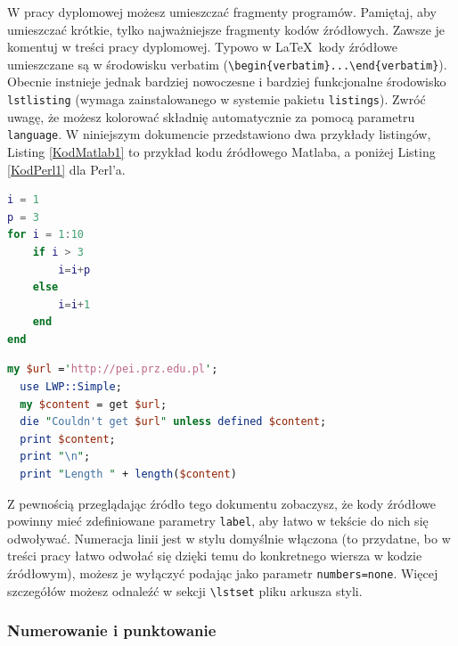 \documentclass[12pt,twoside]{article}
\begin{document}
W pracy dyplomowej możesz umieszczać fragmenty programów. Pamiętaj, aby umieszczać krótkie, tylko najważniejsze fragmenty kodów źródłowych. Zawsze je komentuj w treści
pracy dyplomowej. Typowo w \LaTeX\ kody źródłowe umieszczane są w środowisku verbatim (\verb|\begin{verbatim}...\end{verbatim}|). Obecnie instnieje jednak bardziej nowoczesne i bardziej funkcjonalne środowisko \verb|lstlisting| (wymaga zainstalowanego w systemie pakietu \verb|listings|). Zwróć uwagę, że możesz kolorować składnię
automatycznie za pomocą parametru \verb|language|. W niniejszym dokumencie przedstawiono dwa przykłady listingów, Listing \ref{KodMatlab1} to przykład kodu źródłowego Matlaba, a poniżej Listing \ref{KodPerl1} dla Perl'a.\\

\begin{lstlisting}[language=Matlab,caption=Listing programu Matlab,label={KodMatlab1}]
i = 1
p = 3
for i = 1:10
    if i > 3
        i=i+p
    else 
        i=i+1
    end
end
\end{lstlisting}

\begin{lstlisting}[language=Perl,caption=Listing programu Perl,label={KodPerl1}]
  my $url ='http://pei.prz.edu.pl';
  use LWP::Simple;
  my $content = get $url;
  die "Couldn't get $url" unless defined $content;
  print $content;
  print "\n";
  print "Length " + length($content)
\end{lstlisting}

Z pewnością przeglądając źródło tego dokumentu zobaczysz, że kody źródłowe powinny mieć zdefiniowane parametry \verb|label|, aby łatwo w tekście do nich się odwoływać.
Numeracja linii jest w stylu domyślnie włączona (to przydatne, bo w treści pracy łatwo odwołać się dzięki temu do konkretnego wiersza w kodzie źródłowym), możesz je wyłączyć podając jako parametr \verb|numbers=none|. Więcej szczegółów możesz odnaleźć w sekcji \verb|\lstset| pliku arkusza styli. 


\subsubsection{Numerowanie i punktowanie}
\end{document}
